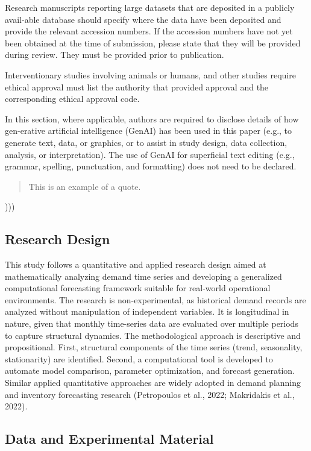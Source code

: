 \documentclass[journal,article,submit,pdftex,moreauthors]{Definitions/mdpi}
\begin{document}
Research manuscripts reporting large datasets that are deposited in a publicly avail-able database should specify where the data have been deposited and provide the relevant accession numbers. If the accession numbers have not yet been obtained at the time of submission, please state that they will be provided during review. They must be provided prior to publication.

Interventionary studies involving animals or humans, and other studies require ethical approval must list the authority that provided approval and the corresponding ethical approval code.

In this section, where applicable, authors are required to disclose details of how gen-erative artificial intelligence (GenAI) has been used in this paper (e.g., to generate text, data, or graphics, or to assist in study design, data collection, analysis, or interpretation). The use of GenAI for superficial text editing (e.g., grammar, spelling, punctuation, and formatting) does not need to be declared.

\begin{quote}
This is an example of a quote.
\end{quote}

)))

\subsection{Research Design}

This study follows a quantitative and applied research design aimed at mathematically analyzing demand time series and developing a generalized computational forecasting framework suitable for real-world operational environments. The research is non-experimental, as historical demand records are analyzed without manipulation of independent variables. It is longitudinal in nature, given that monthly time-series data are evaluated over multiple periods to capture structural dynamics.
The methodological approach is descriptive and propositional. First, structural components of the time series (trend, seasonality, stationarity) are identified. Second, a computational tool is developed to automate model comparison, parameter optimization, and forecast generation. Similar applied quantitative approaches are widely adopted in demand planning and inventory forecasting research (Petropoulos et al., 2022; Makridakis et al., 2022).

\subsection{Data and Experimental Material}
\end{document}
